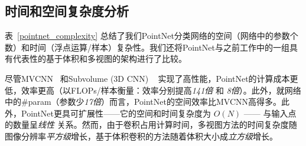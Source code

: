\subsection{时间和空间复杂度分析}
\label{sec:complexity}
表~\ref{pointnet_complexity} 总结了我们PointNet分类网络的空间（网络中的参数个数）和时间（浮点运算/样本）复杂性。我们还将PointNet与之前工作中的一组具有代表性的基于体积和多视图的架构进行了比较。

尽管MVCNN~\cite{su15mvcnn} 和Subvolume (3D CNN) ~\cite{qi2016volumetric} 实现了高性能，PointNet的计算成本更低，效率更高（以FLOPs/样本衡量：效率分别提高\emph{141倍} 和 \emph{8倍}）。此外，就网络中的\#param（参数少\emph{17倍}）而言，PointNet的空间效率比MVCNN高得多。此外，PointNet更具可扩展性——它的空间和时间复杂度为 $O(N)$ —— 与输入点的数量呈\emph{线性} 关系。然而，由于卷积占用计算时间，多视图方法的时间复杂度随图像分辨率\emph{平方级}增长，基于体积卷积的方法随着体积大小成\emph{立方级}增长。

